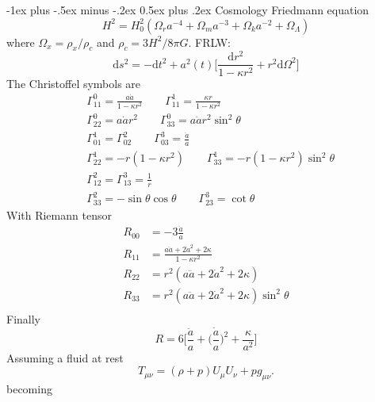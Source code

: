\documentclass[10pt,landscape,a4paper]{article}
\makeatletter
\newcommand{\intgr} {\mathrm{d}}
\newcommand{\munu} {\mu\nu}
\renewcommand{\section}{\@startsection{section}{1}{0mm}%
                                {-1ex plus -.5ex minus -.2ex}%
                                {0.5ex plus .2ex}%
                                {\normalfont\large\bfseries}}
\makeatother
\begin{document}
\begin{multicols}{3}
\section{Cosmology}
Friedmann equation
\begin{equation}
H^2 = H_0^2(\Omega_r a^{-4}+\Omega_m a^{-3} +\Omega_k a^{-2} +\Omega_\Lambda)
\end{equation}
where $\Omega_x = \rho_x/\rho_c$ and $\rho_c=3H^2/8\pi G$.
FRLW:
\begin{equation}
\intgr s^2 = -\intgr t^2 + a^2(t)\bigg[\frac{\intgr r^2}{1-\kappa r^2}+r^2\intgr\Omega^2\bigg]
\end{equation}
The Christoffel symbols are
\begin{equation}
\begin{split}
&\Gamma^0_{11} = \frac{a\dot{a}}{1-\kappa r^2} \qquad \Gamma^1_{11} = \frac{\kappa r}{1-\kappa r^2}\\
&\Gamma^0_{22} = a\dot{a}r^2 \qquad \Gamma^0_{33} = a\dot{a}r^2\sin^2\theta\\
&\Gamma^1_{01} = \Gamma^2_{02} \qquad \Gamma^3_{03} = \frac{\dot{a}}{a} \\
&\Gamma^1_{22} = -r(1-\kappa r^2) \qquad \Gamma^1_{33} = -r(1-\kappa r^2) \sin^2\theta\\
&\Gamma^2_{12} = \Gamma^3_{13} = \frac{1}{r}\\
&\Gamma^2_{33} = -\sin\theta\cos\theta \qquad \Gamma^3_{23} = \cot\theta
\end{split}
\end{equation}
With Riemann tensor
\begin{equation}
\begin{split}
R_{00} &= -3\frac{\ddot{a}}{a}\\
R_{11} &= \frac{a\ddot{a}+2\dot{a}^2+2\kappa}{1-\kappa r^2}\\
R_{22} &= r^2(a\ddot{a}+2\dot{a}^2+2\kappa)\\
R_{33} &= r^2(a\ddot{a}+2\dot{a}^2+2\kappa)\sin^2\theta\\
\end{split}
\end{equation}
Finally
\begin{equation}
R = 6\bigg[\frac{\ddot{a}}{a} +\bigg(\frac{\dot{a}}{a}\bigg)^2+\frac{\kappa}{a^2}\bigg]
\end{equation}
Assuming a fluid at rest
\begin{equation}
T_{\munu} = (\rho +p)U_\mu U_\nu + pg_{\munu}.
\end{equation}
becoming
\begin{equation}

\end{equation}
\end{multicols}
\end{document}
